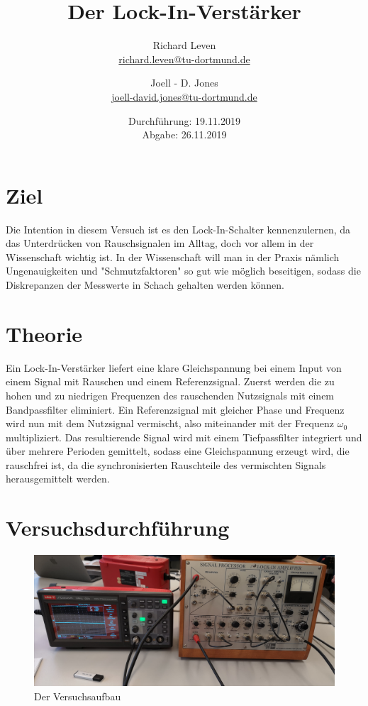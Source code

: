 \documentclass[captions=tableheading]{scrartcl}
\title{Der Lock-In-Verstärker}
\author{Richard Leven \\ \href{mailto:richard.leven@tu-dortmund.de}{richard.leven@tu-dortmund.de}
 \and Joell - D. Jones \\ \href{mailto:joell-david.jones@tu-dortmund.de}{joell-david.jones@tu-dortmund.de}}
\date{
    Durchführung: 19.11.2019\\
    Abgabe: 26.11.2019
}
\begin{document}
\maketitle
\newpage
\section{Ziel}
Die Intention in diesem Versuch ist es den Lock-In-Schalter kennenzulernen, da das Unterdrücken von Rauschsignalen im Alltag, doch vor allem in der Wissenschaft wichtig ist. In der Wissenschaft will man in der Praxis nämlich Ungenauigkeiten und "Schmutzfaktoren" so gut wie möglich beseitigen, sodass die Diskrepanzen der Messwerte in Schach gehalten werden können. 
\section{Theorie}
Ein Lock-In-Verstärker liefert eine klare Gleichspannung bei einem Input von einem Signal mit Rauschen und einem Referenzsignal.
Zuerst werden die zu hohen und zu niedrigen Frequenzen des rauschenden Nutzsignals mit einem Bandpassfilter eliminiert.
Ein Referenzsignal mit gleicher Phase und Frequenz wird nun mit dem Nutzsignal vermischt, also miteinander mit der Frequenz \(\omega_0\) multipliziert. Das resultierende Signal wird mit einem Tiefpassfilter integriert und über mehrere Perioden gemittelt, sodass eine Gleichspannung erzeugt wird, die rauschfrei ist, da die synchronisierten Rauschteile des vermischten Signals herausgemittelt werden.
\section{Versuchsdurchführung}
\begin{figure}
\centering
\includegraphics[scale=0.07]{Lock_In Bilder/Versauf.jpg}
\caption{Der Versuchsaufbau}
\label{fig:versau}
\end{figure}
\end{document}
